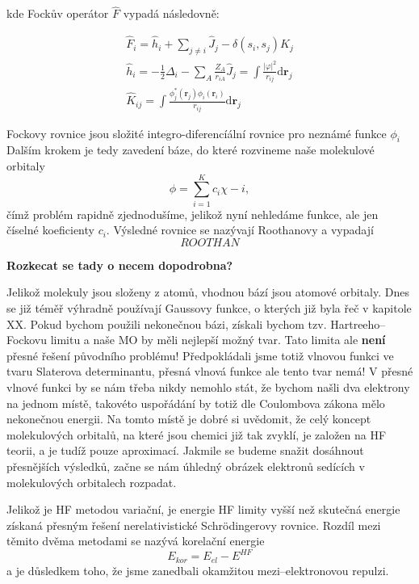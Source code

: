 kde Fockův operátor $\hat{F}$ vypadá následovně:

\begin{eqnarray}
\hat{F}_i = \hat{h}_i+\sum_{j\neq i} \hat{J}_j - \delta(s_i,s_j) \hat{K}_j \\
\hat{h}_i = -\frac{1}{2}\Delta_i - \sum_{A}\frac{Z_A}{r_{iA}}
\hat{J}_j=\int \frac{|\varphi |^2}{r_{ij}}\mathrm{d}\textbf{r}_j \\
\hat{K}_{ij} = \int \frac{\phi_j^*(\mathbf{r}_j)\phi_i(\mathbf{r}_i)}{r_{ij}}\mathrm{d}\textbf{r}_j
\end{eqnarray}

Fockovy rovnice jsou složité integro-diferencíální rovnice pro neznámé funkce $\phi_i$
Dalším krokem je tedy zavedení báze, do které rozvineme naše molekulové orbitaly
\begin{equation}
\phi=\sum_{i=1}^K c_i \chi-i ,
\end{equation}
čímž problém rapidně zjednodušíme, jelikož nyní nehledáme funkce, ale jen číselné koeficienty $c_i$.
Výsledné rovnice se nazývají Roothanovy a vypadají
\begin{equation}
ROOTHAN
\end{equation}

\textbf{Rozkecat se tady o necem dopodrobna?}

Jelikož molekuly jsou složeny z atomů, vhodnou bází jsou atomové orbitaly.
Dnes se již téměř výhradně používají Gaussovy funkce, o kterých již byla řeč v kapitole XX.
Pokud bychom použili nekonečnou bázi, získali bychom tzv. Hartreeho--Fockovu limitu a naše MO by měli nejlepší možný tvar. Tato limita ale \textbf{není} přesné řešení původního problému!
Předpokládali jsme totiž vlnovou funkci ve tvaru Slaterova determinantu, přesná vlnová funkce ale tento tvar nemá! V přesné vlnové funkci by se nám třeba nikdy nemohlo stát, že bychom našli dva elektrony na jednom místě, takovéto uspořádání by totiž dle Coulombova zákona mělo nekonečnou energii.
Na tomto místě je dobré si uvědomit, že celý koncept molekulových orbitalů, na které jsou chemici již tak zvyklí, je založen na HF teorii, a je tudíž pouze aproximací. Jakmile se budeme snažit dosáhnout přesnějších výsledků, začne se nám úhledný obrázek elektronů sedících v molekulových orbitalech rozpadat.

Jelikož je HF metodou variační, je energie HF limity vyšší než skutečná energie získaná přesným řešení nerelativistické Schr\"{o}dingerovy rovnice.
Rozdíl mezi těmito dvěma metodami se nazývá korelační energie
\begin{equation}
E_{kor}=E_{el} - E^{HF}
\end{equation}
a je důsledkem toho, že jsme zanedbali okamžitou mezi--elektronovou repulzi.

